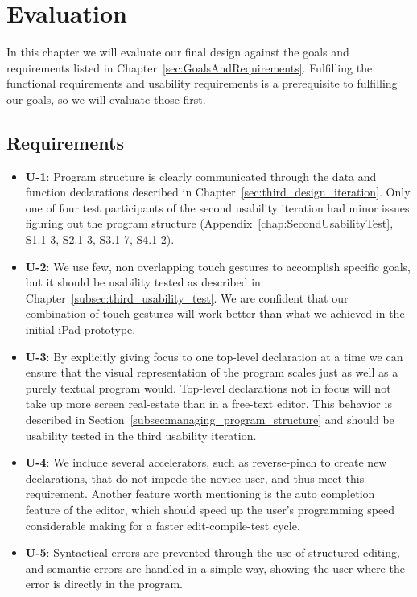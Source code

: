 \chapter{Evaluation}
\label{sec:Evaluation}
In this chapter we will evaluate our final design against the goals and requirements listed in Chapter~\ref{sec:GoalsAndRequirements}.
Fulfilling the functional requirements and usability requirements is a
prerequisite to fulfilling our goals, so we will evaluate those first.

\section{Requirements}
\begin{itemize}

\item \textbf{U-1}: Program structure is clearly communicated through the data and function declarations described in Chapter~\ref{sec:third_design_iteration}.
Only one of four test participants of the second usability iteration had minor
issues figuring out the program structure (Appendix~\ref{chap:SecondUsabilityTest},
S1.1-3, S2.1-3, S3.1-7, S4.1-2).
\item \textbf{U-2}: We use few, non overlapping touch gestures to accomplish specific goals,
but it should be usability tested as described in Chapter~\ref{subsec:third_usability_test}.
We are confident that our combination of touch gestures will work better than
what we achieved in the initial iPad prototype.
\item \textbf{U-3}: By explicitly giving focus to one top-level declaration at
a time we can ensure that the visual representation of the program scales just
as well as a purely textual program would. Top-level declarations not in focus
will not take up more screen real-estate than in a free-text editor. This
behavior is described in Section~\ref{subsec:managing_program_structure} and
should be usability tested in the third usability iteration.
\item \textbf{U-4}: We include several accelerators, such as reverse-pinch to create new declarations, that do not impede the novice user, and thus meet this requirement.
Another feature worth mentioning is the auto completion feature of the editor,
which should speed up the user's programming speed considerable making for a
faster edit-compile-test cycle.
\item \textbf{U-5}: Syntactical errors are prevented through the use of structured editing, and semantic errors are handled in a simple way, showing the user where the error is directly in the program.

\end{itemize}
